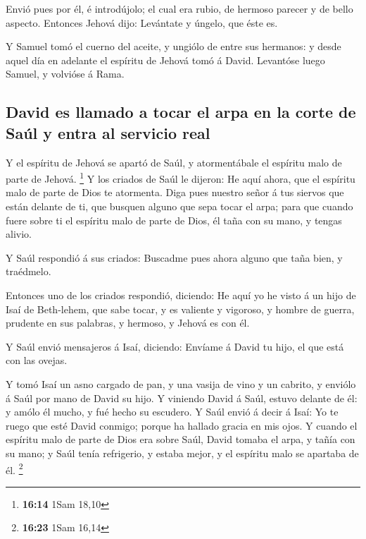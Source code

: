  Envió pues por él, é introdújolo; el cual era rubio, de
hermoso parecer y de bello aspecto. Entonces Jehová dijo: Levántate y
úngelo, que éste es.

 Y Samuel tomó el cuerno del aceite, y ungiólo de entre sus
hermanos: y desde aquel día en adelante el espíritu de Jehová tomó á
David. Levantóse luego Samuel, y volvióse á Rama.

\hypertarget{david-es-llamado-a-tocar-el-arpa-en-la-corte-de-sauxfal-y-entra-al-servicio-real}{%
\subsection{David es llamado a tocar el arpa en la corte de Saúl y entra
al servicio
real}\label{david-es-llamado-a-tocar-el-arpa-en-la-corte-de-sauxfal-y-entra-al-servicio-real}}

 Y el espíritu de Jehová se apartó de Saúl, y atormentábale
el espíritu malo de parte de Jehová. \footnote{\textbf{16:14} 1Sam 18,10}
 Y los criados de Saúl le dijeron: He aquí ahora, que el
espíritu malo de parte de Dios te atormenta.  Diga pues
nuestro señor á tus siervos que están delante de ti, que busquen alguno
que sepa tocar el arpa; para que cuando fuere sobre ti el espíritu malo
de parte de Dios, él taña con su mano, y tengas alivio.

 Y Saúl respondió á sus criados: Buscadme pues ahora alguno
que taña bien, y traédmelo.

 Entonces uno de los criados respondió, diciendo: He aquí
yo he visto á un hijo de Isaí de Beth-lehem, que sabe tocar, y es
valiente y vigoroso, y hombre de guerra, prudente en sus palabras, y
hermoso, y Jehová es con él.

 Y Saúl envió mensajeros á Isaí, diciendo: Envíame á David
tu hijo, el que está con las ovejas.

 Y tomó Isaí un asno cargado de pan, y una vasija de vino y
un cabrito, y enviólo á Saúl por mano de David su hijo.  Y
viniendo David á Saúl, estuvo delante de él: y amólo él mucho, y fué
hecho su escudero.  Y Saúl envió á decir á Isaí: Yo te
ruego que esté David conmigo; porque ha hallado gracia en mis ojos.
 Y cuando el espíritu malo de parte de Dios era sobre Saúl,
David tomaba el arpa, y tañía con su mano; y Saúl tenía refrigerio, y
estaba mejor, y el espíritu malo se apartaba de él. \footnote{\textbf{16:23}
  1Sam 16,14}

